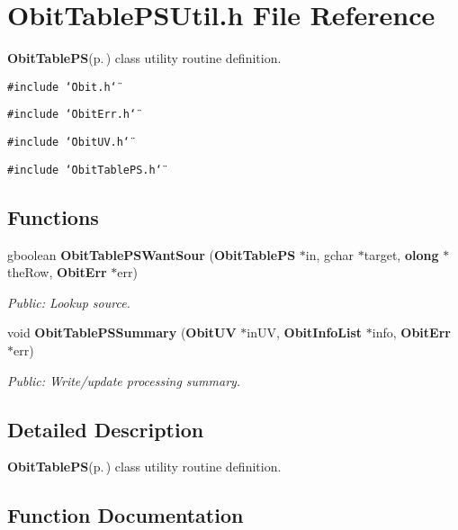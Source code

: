 \section{Obit\-Table\-PSUtil.h File Reference}
\label{ObitTablePSUtil_8h}
{\bf Obit\-Table\-PS}{\rm (p.\,\pageref{structObitTablePS})} class utility routine definition. 

{\tt \#include \char`\"{}Obit.h\char`\"{}}\par
{\tt \#include \char`\"{}Obit\-Err.h\char`\"{}}\par
{\tt \#include \char`\"{}Obit\-UV.h\char`\"{}}\par
{\tt \#include \char`\"{}Obit\-Table\-PS.h\char`\"{}}\par
\subsection*{Functions}
\begin{CompactItemize}
\item 
gboolean {\bf Obit\-Table\-PSWant\-Sour} ({\bf Obit\-Table\-PS} $\ast$in, gchar $\ast$target, {\bf olong} $\ast$the\-Row, {\bf Obit\-Err} $\ast$err)
\begin{CompactList}\small\item\em Public: Lookup source. \item\end{CompactList}\item 
void {\bf Obit\-Table\-PSSummary} ({\bf Obit\-UV} $\ast$in\-UV, {\bf Obit\-Info\-List} $\ast$info, {\bf Obit\-Err} $\ast$err)
\begin{CompactList}\small\item\em Public: Write/update processing summary. \item\end{CompactList}\end{CompactItemize}


\subsection{Detailed Description}
{\bf Obit\-Table\-PS}{\rm (p.\,\pageref{structObitTablePS})} class utility routine definition. 



\subsection{Function Documentation}
